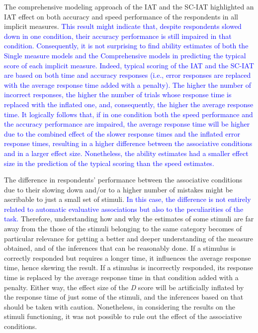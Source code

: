 \documentclass[12pt]{book}
\begin{document}
The comprehensive modeling approach of the IAT and the SC-IAT highlighted an IAT effect on both accuracy and speed performance of the respondents in all implicit measures. 
\textcolor{blue}{This result might indicate that, despite respondents slowed down in one condition, their accuracy performance is still impaired in that condition.
Consequently, it is not surprising to find ability estimates of both the Single measure models and the Comprehensive models in predicting the typical score of each implicit measure. 
Indeed, typical scoring of the IAT and the SC-IAT are based on both time and accuracy responses (i.e., error responses are replaced with the average response time added with a penalty). 
The higher the number of incorrect responses, the higher the number of trials whose response time is replaced with the inflated one, and, consequently, the higher the average response time. 
It logically follows that, if in one condition both the speed performance and the accuracy performance are impaired, the average response time will be higher due to the combined effect of the slower response times and the inflated error response times, resulting in a higher difference between the associative conditions and in a larger effect size.
Nonetheless, the ability estimates had a smaller effect size in the prediction of the typical scoring than the speed estimates.}

The difference in respondents' performance between the associative conditions due to their slowing down and/or to a higher number of mistakes might be ascribable to just a small set of stimuli. 
\textcolor{blue}{In this case, the difference is not entirely related to automatic evaluative associations but also to the peculiarities of the task.}
Therefore, understanding how and why the estimates of some stimuli are far away from the those of the stimuli belonging to the same category becomes of particular relevance for getting a better and deeper understanding of the measure obtained, and of the inferences that can be reasonably done.
If a stimulus is correctly responded but requires a longer time, it influences the average response time, hence skewing the result.
 If a stimulus is incorrectly responded, its response time is replaced by the average response time in that condition added with a penalty. 
Either way, the effect size of the \emph{D} score will be artificially inflated by the response time of just some of the stimuli, and the inferences based on that should be taken with caution. 
Nonetheless, in considering the results on the stimuli functioning, it was not possible to rule out the effect of the associative conditions.
\end{document}
